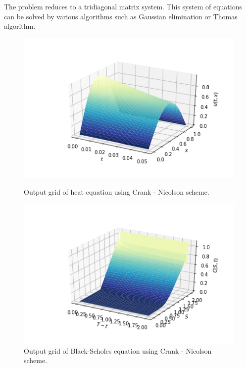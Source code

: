 \documentclass[12pt, oneside]{book}
\theoremstyle{plain}
\theoremstyle{definition}
\begin{document}
The problem reduces to a tridiagonal matrix system. This system of equations can be solved by various algorithms such as Gaussian elimination or Thomas algorithm.

\begin{figure}[!htb]
  \begin{minipage}[b]{0.5\textwidth}
    \includegraphics[width=\textwidth]{HeatCNGrid.png}
    \caption{Output grid of heat equation using Crank - Nicolson scheme.}
  \end{minipage}
  \begin{minipage}[b]{0.5\textwidth}
    \includegraphics[width=\textwidth]{BSCNGrid.png}
    \caption{Output grid of Black-Scholes equation using Crank - Nicolson scheme.}
  \end{minipage}
\end{figure}
\end{document}
